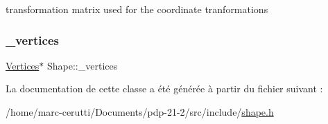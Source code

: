 transformation matrix used for the coordinate tranformations 

\mbox{\label{class_shape_ac2f7f1148a34325d99be6d983fcf9bb0}} 
\subsubsection{\texorpdfstring{\+\_\+vertices}{\_vertices}}
{\footnotesize\ttfamily \hyperlink{struct_shape_1_1_vertices}{Vertices}$\ast$ Shape\+::\+\_\+vertices\hspace{0.3cm}{\ttfamily [protected]}}



La documentation de cette classe a été générée à partir du fichier suivant \+:\begin{DoxyCompactItemize}
\item 
/home/marc-\/cerutti/\+Documents/pdp-\/21-\/2/src/include/\hyperlink{shape_8h}{shape.\+h}\end{DoxyCompactItemize}
